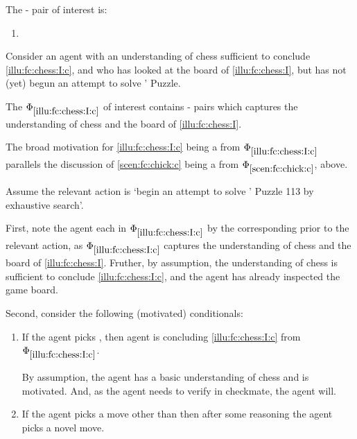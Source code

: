 \begin{note}
  The - pair of interest is:

  \begin{enumerate}[label=C\thescenarioCounter., ref=C\thescenarioCounter]
  \item
    \label{illu:fc:chess:I:c}
  \end{enumerate}
  Consider an agent with an understanding of chess sufficient to conclude \ref{illu:fc:chess:I:c}, and who has looked at the board of \autoref{illu:fc:chess:I}, but has not (yet) begun an attempt to solve \citeauthor{Emms:2000aa}' Puzzle.

  The \pool{} \(\Phi_{\ref{illu:fc:chess:I:c}}\) of interest contains - pairs which captures the \agents{} understanding of chess and the board of \autoref{illu:fc:chess:I}.

  The broad motivation for \ref{illu:fc:chess:I:c} being a \fc{} from \(\Phi_{\ref{illu:fc:chess:I:c}}\) parallels the discussion of  \ref{scen:fc:chick:c} being a \fc{} from \(\Phi_{\ref{scen:fc:chick:c}}\), above.

  Assume the relevant action is `begin an attempt to solve \citeauthor{Emms:2000aa}' Puzzle 113 by exhaustive search'.

  First, note the agent \evals{} each \prop{} in \(\Phi_{\ref{illu:fc:chess:I:c}}\) by the corresponding \val{} prior to the relevant action, as \(\Phi_{\ref{illu:fc:chess:I:c}}\) captures the \agents{} understanding of chess and the board of \autoref{illu:fc:chess:I}.
  Fruther, by assumption, the \agents{} understanding of chess is sufficient to conclude \ref{illu:fc:chess:I:c}, and the agent has already inspected the game board.

  Second, consider the following (motivated) conditionals:

  \begin{enumerate}[label=\arabic*., ref=(\arabic*)]
  \item
    \label{illu:fc:chess:I:cond:1}
    If the agent picks , then agent is concluding \ref{illu:fc:chess:I:c} from \(\Phi_{\ref{illu:fc:chess:I:c}}\).
    \smallskip

    By assumption, the agent has a basic understanding of chess and is motivated.
    And, as the agent needs to verify  in checkmate, the agent will.
  \item
    \label{illu:fc:chess:I:cond:2}
    If the agent picks a move other than  then after some reasoning the agent picks a novel move.%
    \smallskip


\end{enumerate}
\end{note}
